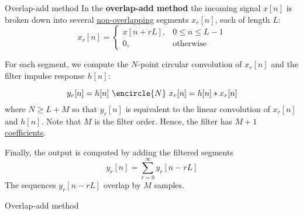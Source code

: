 \documentclass[10pt, aspectratio=169]{beamer}
\begin{document}
\begin{frame}{Overlap-add method}
In the \textbf{overlap-add method} the incoming signal $x[n]$ is broken down into several \underline{non-overlapping} segments $x_r[n]$, each of length $L$:
\begin{equation*}
	x_r[n] = \begin{cases}
	x[n + rL], & 0 \leq n \leq L-1\\
	0, & \text{otherwise}
	\end{cases}
\end{equation*}

For each segment, we compute the $N$-point circular convolution of $x_r[n]$ and the filter impulse response $h[n]$:

\begin{equation*}
	y_r[n] = h[n]~\encircle{N}~x_r[n] = h[n]\ast x_r[n]
\end{equation*}
where $N \geq L + M$ so that $y_r[n]$ is equivalent to the linear convolution of $x_r[n]$ and $h[n]$. Note that $M$ is the filter order. Hence, the filter has \underline{$M+1$ coefficients}.

Finally, the output is computed by adding the filtered segments
\begin{equation*}
	y_r[n] = \sum_{r = 0}^{\infty} y_r[n - rL]
\end{equation*}
The sequences $y_r[n-rL]$ overlap by $M$ samples.
\end{frame}

%
\begin{frame}{Overlap-add method}
\begin{center}
	\resizebox{0.62\textwidth}{!}{}
\end{center}	
\end{frame}
\end{document}
